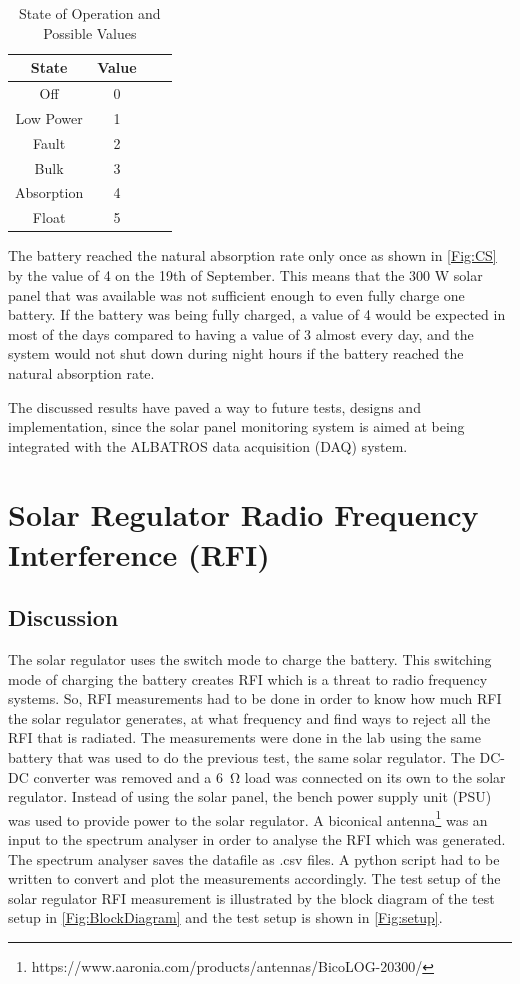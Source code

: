 \documentclass[12pt,a4paper]{report}
\begin{document}
\begin{table}[h!]
	\centering
	\begin{tabular}{|c | c | c | c|} 
		\hline
		State & Value \\ [0.5ex] 
		\hline
		Off & 0  \\
		\hline
		Low Power & 1 \\
		\hline
		Fault & 2 \\
		\hline
		Bulk & 3 \\
		\hline
		Absorption & 4 \\ [1ex] 
		\hline
		Float & 5 \\ [1ex] 
		\hline
	\end{tabular}
	\caption{State of Operation and Possible Values}
	\label{table:CS}
\end{table}

\newpage
The battery reached the natural absorption rate only once as shown in \autoref{Fig:CS} by the value of 4 on the 19th of September. This means that the 300 W solar panel that was available was not sufficient enough to even fully charge one battery. If the battery was being fully charged, a value of 4 would be expected in most of the days compared to having a value of 3 almost every day, and the system would not shut down during night hours if the battery reached the natural absorption rate.

The discussed results have paved a way to future tests, designs and implementation, since the solar panel monitoring system is aimed at being integrated with the ALBATROS data acquisition (DAQ) system.

\newpage
\section{Solar Regulator Radio Frequency Interference (RFI)}
\subsection{Discussion}
The solar regulator uses the switch mode to charge the battery. This switching mode of charging the battery creates RFI which is a threat to radio frequency systems. So, RFI measurements had to be done in order to know how much RFI the solar regulator generates, at what frequency and find ways to reject all the RFI that is radiated. The measurements were done in the lab using the same battery that was used to do the previous test, the same solar regulator. The DC-DC converter was removed and a \SI{6}{\ohm} load was connected on its own to the solar regulator. Instead of using the solar panel, the bench power supply unit (PSU) was used to provide power to the solar regulator. A biconical antenna\footnote{https://www.aaronia.com/products/antennas/BicoLOG-20300/} was an input to the spectrum analyser in order to analyse the RFI which was generated.  The spectrum analyser saves the datafile as .csv files. A python script had to be written to convert and plot the measurements accordingly. The test setup of the solar regulator RFI measurement is illustrated by the block diagram of the test setup in \autoref{Fig:BlockDiagram} and the test setup is shown in \autoref{Fig:setup}.\\
\end{document}
